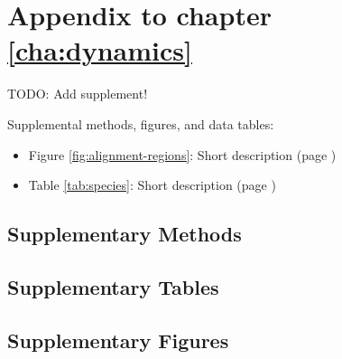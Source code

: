 \chapter{Appendix to chapter \ref{cha:dynamics}}

TODO: Add supplement!

\ifdraft{%
}%
{%
}%

Supplemental methods, figures, and data tables:

\begin{itemize}
	\item Figure \ref{fig:alignment-regions}: Short description (page \pageref{fig:alignment-regions})
\end{itemize}

\begin{itemize}
	\item Table \ref{tab:species}: Short description (page \pageref{tab:species})
\end{itemize}

\section{Supplementary Methods}

\section{Supplementary Tables}

\section{Supplementary Figures}
